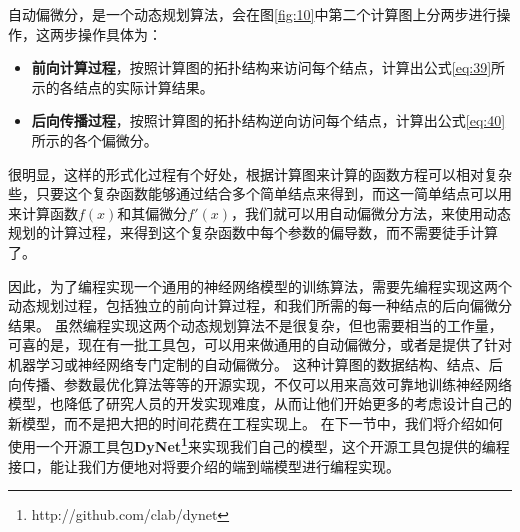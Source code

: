 \documentclass[10pt,a4paper]{ctexart}
\begin{document}
自动偏微分，是一个动态规划算法，会在图\ref{fig:10}中第二个计算图上分两步进行操作，这两步操作具体为：
\begin{itemize}
\item \textbf{前向计算过程}，按照计算图的拓扑结构来访问每个结点，计算出公式\ref{eq:39}所示的各结点的实际计算结果。
\item \textbf{后向传播过程}，按照计算图的拓扑结构逆向访问每个结点，计算出公式\ref{eq:40}所示的各个偏微分。
\end{itemize}
很明显，这样的形式化过程有个好处，根据计算图来计算的函数方程可以相对复杂些，只要这个复杂函数能够通过结合多个简单结点来得到，而这一简单结点可以用来计算函数$f(x)$和其偏微分$f'(x)$，我们就可以用自动偏微分方法，来使用动态规划的计算过程，来得到这个复杂函数中每个参数的偏导数，而不需要徒手计算了。

因此，为了编程实现一个通用的神经网络模型的训练算法，需要先编程实现这两个动态规划过程，包括独立的前向计算过程，和我们所需的每一种结点的后向偏微分结果。
虽然编程实现这两个动态规划算法不是很复杂，但也需要相当的工作量，可喜的是，现在有一批工具包，可以用来做通用的自动偏微分\cite{bendtsen1996fadbad,hogan2014fast}，或者是提供了针对机器学习或神经网络专门定制的自动偏微分\cite{abadi2016tensorflow,bergstra2010theano,collobert2002torch,tokui2015chainer,neubig2017dynet}。
这种计算图的数据结构、结点、后向传播、参数最优化算法等等的开源实现，不仅可以用来高效可靠地训练神经网络模型，也降低了研究人员的开发实现难度，从而让他们开始更多的考虑设计自己的新模型，而不是把大把的时间花费在工程实现上。
在下一节中，我们将介绍如何使用一个开源工具包\textbf{DyNet\footnote{http://github.com/clab/dynet}}来实现我们自己的模型，这个开源工具包提供的编程接口，能让我们方便地对将要介绍的端到端模型进行编程实现。
\end{document}
